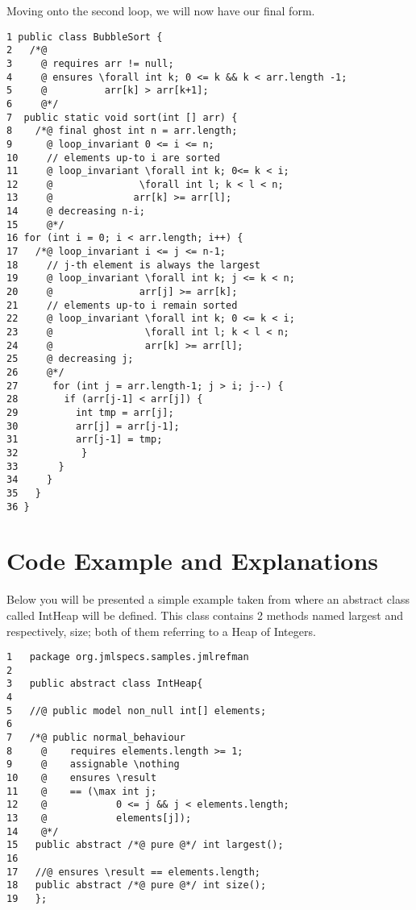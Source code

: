\documentclass{article}
\begin{document}
Moving onto the second loop, we will now have our final form.
\begin{lstlisting}[columns=fixed, basewidth=0.5em, basicstyle={\ttfamily}]
1 public class BubbleSort {    
2   /*@
3     @ requires arr != null; 
4     @ ensures \forall int k; 0 <= k && k < arr.length -1;
5     @          arr[k] > arr[k+1];
6     @*/
7  public static void sort(int [] arr) {        
8    /*@ final ghost int n = arr.length;   
9      @ loop_invariant 0 <= i <= n;
10     // elements up-to i are sorted
11     @ loop_invariant \forall int k; 0<= k < i; 
12     @               \forall int l; k < l < n; 
13     @              arr[k] >= arr[l];
14     @ decreasing n-i;
15     @*/
16 for (int i = 0; i < arr.length; i++) {
17   /*@ loop_invariant i <= j <= n-1; 
18     // j-th element is always the largest
19     @ loop_invariant \forall int k; j <= k < n; 
20     @               arr[j] >= arr[k]; 
21     // elements up-to i remain sorted
22     @ loop_invariant \forall int k; 0 <= k < i; 
23     @                \forall int l; k < l < n; 
24     @                arr[k] >= arr[l]; 
25     @ decreasing j;
26     @*/
27      for (int j = arr.length-1; j > i; j--) {
28        if (arr[j-1] < arr[j]) {
29          int tmp = arr[j];
30          arr[j] = arr[j-1];
31          arr[j-1] = tmp;
32           }
33       }
34     }
35   }
36 }
\end{lstlisting}


\section{Code Example and Explanations}

Below you will be presented a simple example taken from \cite{leavens2008jml} where an abstract class called IntHeap will be defined. This class contains 2 methods named largest and respectively, size; both of them referring to a Heap of Integers. 
\begin{lstlisting}[columns=fixed, basewidth=0.5em, basicstyle={\ttfamily}]
1   package org.jmlspecs.samples.jmlrefman
2
3   public abstract class IntHeap{
4
5   //@ public model non_null int[] elements;
6
7   /*@ public normal_behaviour
8     @    requires elements.length >= 1;
9     @    assignable \nothing
10    @    ensures \result 
11    @    == (\max int j;
12    @            0 <= j && j < elements.length;
13    @            elements[j]);
14    @*/
15   public abstract /*@ pure @*/ int largest();
16
17   //@ ensures \result == elements.length;
18   public abstract /*@ pure @*/ int size();
19   };
\end{lstlisting}
\end{document}

